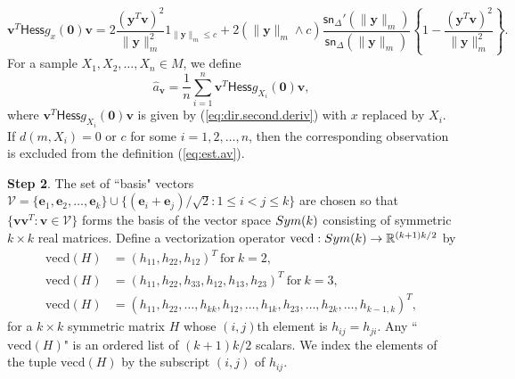 \documentclass[preprint]{imsart}
\newcommand{\cV}{\mathcal{V}}
\def\ev{\mathbf e}
\def\vv{\mathbf v}
\def\yv{\mathbf y}
\theoremstyle{plain}
\theoremstyle{remark}
\begin{document}
\begin{appendix}
\begin{equation}
    \vv^T \textsf{Hess} g_{x}(\mathbf{0}) \vv 
    = 2\frac{(\yv^T \vv)^2  }{ \|\yv\|_{m}^2}1_{\|\yv\|_{m} \le c}  + 
    2  (\|\yv\|_{m} \wedge c)  \frac{\textsf{sn}_{\Delta}'(\|\yv\|_{m})}{\textsf{sn}_{\Delta}(\|\yv\|_{m})} \left\{ 1 - \frac{(\yv^T \vv)^2}{\|\yv\|_{m}^2}\right\}.
\end{equation}
For a sample $X_{1}, X_{2}, \ldots, X_{n} \in M$, we define 
\begin{equation}\label{eq:est.av}
\hat{a}_{\vv} = 
\frac{1}{n}\sum_{i=1}^n \vv^T \textsf{Hess} g_{X_{i}}(\mathbf{0}) \vv, 
\end{equation}
where $\vv^T \textsf{Hess} g_{X_{i}}(\mathbf{0}) \vv$ is given by (\ref{eq:dir.second.deriv}) with $x$ replaced by $X_i$. If $d(m, X_{i}) = 0$ or $c$ for some $i =1, 2, \ldots, n$, then the corresponding observation is excluded from the definition (\ref{eq:est.av}). 


\textbf{Step 2}.
The set of ``basis" vectors $\cV = \{\ev_1, \ev_2, \ldots, \ev_k\} \cup\{ (\ev_i + \ev_j)/\sqrt{2} : 1\le i < j \le k \}$ are chosen so that $\{\vv\vv^T: \vv \in \cV\}$ forms the basis of the vector space  ${\rm Sym}(k)$ consisting of symmetric $k\times k$ real matrices. Define a vectorization operator $\mbox{vecd}: {\rm Sym}(k) \to \mathbb{R}^{(k+1)k/2}$ by 
\begin{align}
  \mbox{vecd}(H) &= (h_{11},h_{22}, h_{12})^T  \ \mbox{for}\  k = 2,  \nonumber \\
  \mbox{vecd}(H) &= (h_{11},h_{22}, h_{33}, h_{12}, h_{13}, h_{23})^T  \ \mbox{for}\ k = 3, \label{eq:vecd}\\
  \mbox{vecd}(H) &= (h_{11},h_{22},\ldots,h_{kk}, h_{12},\ldots,h_{1k},h_{23},\ldots,h_{2k},\ldots, h_{k-1,k})^T, \nonumber
\end{align} 
for a $k \times k$ symmetric matrix $H$ whose $(i,j)$th element is $h_{ij} = h_{ji}$. Any ``$\mbox{vecd}(H)$" is an ordered list of ${(k+1)k}/{2}$ scalars. We index the elements of the tuple $\mbox{vecd}(H)$ by the subscript $(i,j)$ of $h_{ij}$. 


\end{appendix}
\end{document}
